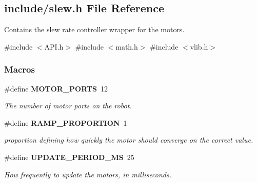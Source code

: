 \subsection{include/slew.h File Reference}
\label{a00065}


Contains the slew rate controller wrapper for the motors.  


{\ttfamily \#include $<$A\+P\+I.\+h$>$}\newline
{\ttfamily \#include $<$math.\+h$>$}\newline
{\ttfamily \#include $<$vlib.\+h$>$}\newline
\subsubsection*{Macros}
\begin{DoxyCompactItemize}
\item 
\#define \textbf{ M\+O\+T\+O\+R\+\_\+\+P\+O\+R\+TS}~12
\begin{DoxyCompactList}\small\item\em The number of motor ports on the robot. \end{DoxyCompactList}\item 
\#define \textbf{ R\+A\+M\+P\+\_\+\+P\+R\+O\+P\+O\+R\+T\+I\+ON}~1
\begin{DoxyCompactList}\small\item\em proportion defining how quickly the motor should converge on the correct value. \end{DoxyCompactList}\item 
\#define \textbf{ U\+P\+D\+A\+T\+E\+\_\+\+P\+E\+R\+I\+O\+D\+\_\+\+MS}~25
\begin{DoxyCompactList}\small\item\em How frequently to update the motors, in milliseconds. \end{DoxyCompactList}\end{DoxyCompactItemize}
